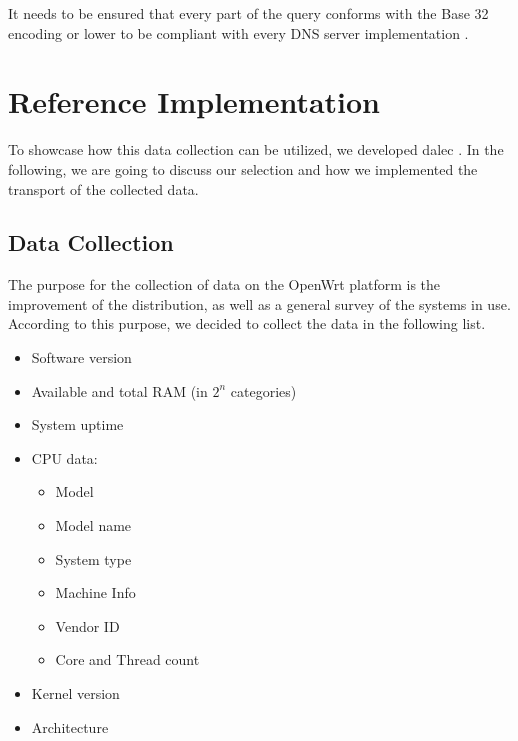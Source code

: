         It needs to be ensured that every part of the query conforms with the Base 32 encoding or lower to be compliant with every DNS server implementation \cite{mockapetris_domain_1987}.

\newpage


\section{Reference Implementation}
\label{sec:software_design:ref_impl}
    To showcase how this data collection can be utilized, we developed dalec \cite{venz_ikstreamdalec_2021}.
    In the following, we are going to discuss our selection and how we implemented the transport of the collected data.
%
\subsection{Data Collection}
    The purpose for the collection of data on the OpenWrt platform is the improvement of the distribution, as well as a general survey of the systems in use. According to this purpose, we decided to collect the data in the following list. 
    \begin{itemize}
        \item Software version
        \item Available and total RAM (in $2^n$ categories)
        \item System uptime
        \item CPU data:
        \begin{itemize}
            \item Model
            \item Model name
            \item System type
            \item Machine Info
            \item Vendor ID
            \item Core and Thread count
        \end{itemize}
        \item Kernel version
        \item Architecture
    \end{itemize}
    
